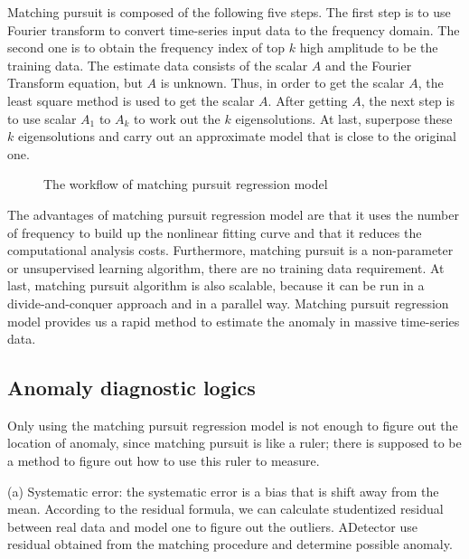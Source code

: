 \documentclass{vgtc}                          %
\begin{document}
Matching pursuit is composed of the following five steps. The first step is to use Fourier transform to convert time-series input data to the frequency domain. The second one is to obtain the frequency index of top $k$ high amplitude to be the training data. The estimate data consists of the scalar $A$ and the Fourier Transform equation, but $A$ is unknown. Thus, in order to get the scalar $A$, the least square method is used to get the scalar $A$. After getting $A$, the next step is to use scalar $A_1$ to $A_k$ to work out the $k$ eigensolutions. At last, superpose these $k$ eigensolutions and carry out an approximate model that is close to the original one.

\begin{figure}[htb]
	\caption{The workflow of matching pursuit regression model}
	\label{fig:fft}
\end{figure}

The advantages of matching pursuit regression model are that it uses the number of frequency to build up the nonlinear fitting curve and that it reduces the computational analysis costs. Furthermore, matching pursuit is a non-parameter or unsupervised learning algorithm, there are no training data requirement. At last, matching pursuit algorithm is also scalable, because it can be run in a divide-and-conquer approach and in a parallel way. Matching pursuit regression model provides us a rapid method to estimate the anomaly in massive time-series data. 

\subsection{Anomaly diagnostic logics}
Only using the matching pursuit regression model is not enough to figure out the location of anomaly, since matching pursuit is like a ruler; there is supposed to be a method to figure out how to use this ruler to measure.
	
(a) Systematic error: the systematic error is a bias that is shift away from the mean. According to the residual formula, we can calculate studentized residual between real data and model one to figure out the outliers. ADetector use residual obtained from the matching procedure and determine possible anomaly.
			
\end{document}
